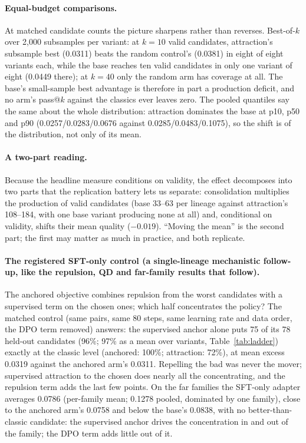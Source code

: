 \documentclass[11pt]{article}
\begin{document}
\paragraph{Equal-budget comparisons.} At matched candidate counts the
picture sharpens rather than reverses. Best-of-$k$ over 2{,}000
subsamples per variant: at $k{=}10$ valid candidates, attraction's
subsample best (0.0311) beats the random control's (0.0381) in eight of
eight variants each, while the base reaches ten valid candidates in only
one variant of eight (0.0449 there); at $k{=}40$ only the random arm has
coverage at all. The base's small-sample best advantage is therefore in
part a production deficit, and no arm's pass@$k$ against the classics
ever leaves zero. The pooled quantiles say the same about the whole
distribution: attraction dominates the base at p10, p50 and p90
(0.0257/0.0283/0.0676 against 0.0285/0.0483/0.1075), so the shift is of
the distribution, not only of its mean.

\paragraph{A two-part reading.} Because the headline measure conditions
on validity, the effect decomposes into two parts that the replication
battery lets us separate: consolidation multiplies the production of
valid candidates (base 33--63 per lineage against attraction's
108--184, with one base variant producing none at all) and, conditional
on validity, shifts their mean quality ($-0.019$). ``Moving the mean''
is the second part; the first may matter as much in practice, and both
replicate.

\paragraph{The registered SFT-only control (a single-lineage mechanistic
follow-up, like the repulsion, QD and far-family results that follow).}
The anchored objective
combines repulsion from the worst candidates with a supervised term on
the chosen ones; which half concentrates the policy? The matched control
(same pairs, same 80 steps, same learning rate and data order, the DPO
term removed) answers: the supervised anchor alone puts 75 of its 78
held-out candidates (96\%; 97\% as a mean over variants,
Table~\ref{tab:ladder}) exactly at the classic level (anchored: 100\%;
attraction: 72\%), at mean excess 0.0319 against the anchored arm's
0.0311. Repelling the bad was never the mover; supervised attraction to
the chosen does nearly all the concentrating, and the repulsion term
adds the last few points. On the far families the SFT-only adapter
averages 0.0786 (per-family mean; 0.1278 pooled, dominated by one
family), close to the anchored arm's 0.0758 and below the base's 0.0838,
with no better-than-classic candidate: the supervised anchor drives the
concentration in and out of the family; the DPO term adds little out of
it.
\end{document}
